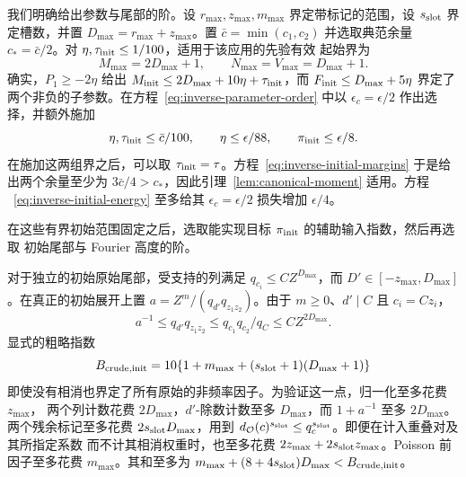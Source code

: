 我们明确给出参数与尾部的阶。设 \(r_{\max},z_{\max},m_{\max}\) 界定带标记的范围，设
\(s_{\rm slot}\) 界定槽数，并置 \(D_{\max}=r_{\max}+z_{\max}\)。置 \(\bar c=\min(c_1,c_2)\)
并选取典范余量 \(c_*=\bar c/2\)。对 \(\eta,\tau_{\rm init}\le1/100\)，适用于该应用的先验有效
起始界为
\[
 M_{\max}=2D_{\max}+1,\qquad N_{\max}=V_{\max}=D_{\max}+1.
\]
确实，\(P_1\ge-2\eta\) 给出 \(M_{\rm init}\le2D_{\max}+10\eta+\tau_{\rm init}\)，而
\(F_{\rm init}\le D_{\max}+5\eta\) 界定了两个非负的子参数。在方程~\eqref{eq:inverse-parameter-order}
中以 \(\epsilon_c=\epsilon/2\) 作出选择，并额外施加
\[
 \eta,\tau_{\rm init}\le\bar c/100,\qquad
 \eta\le\epsilon/88,\qquad \pi_{\rm init}\le\epsilon/8.
\]
在施加这两组界之后，可以取 \(\tau_{\rm init}=\tau\)。方程~\eqref{eq:inverse-initial-margins}
于是给出两个余量至少为 \(3\bar c/4>c_*\)，因此引理~\ref{lem:canonical-moment} 适用。方程
~\eqref{eq:inverse-initial-energy} 至多给其 \(\epsilon_c=\epsilon/2\) 损失增加 \(\epsilon/4\)。

在这些有界初始范围固定之后，选取能实现目标 \(\pi_{\rm init}\) 的辅助输入指数，然后再选取
初始尾部与 Fourier 高度的阶。

对于独立的初始原始尾部，受支持的列满足 \(q_{c_i}\le C Z^{D_{\max}}\)，而
\(D'\in[-z_{\max},D_{\max}]\)。在真正的初始展开上置 \(a=Z^m/(q_{d'}q_{z_1z_2})\)。由于
\(m\ge0\)、\(d'\mid C\) 且 \(c_i=Cz_i\)，
\[
 a^{-1}\le q_{d'}q_{z_1z_2}
       \le q_{c_1}q_{c_2}/q_C\le C Z^{2D_{\max}}.
\]
显式的粗略指数
\[
 B_{\rm crude,init}=10\{1+m_{\max}+(s_{\rm slot}+1)(D_{\max}+1)\}
\]
即使没有相消也界定了所有原始的非频率因子。为验证这一点，归一化至多花费 \(z_{\max}\)，
两个列计数花费 \(2D_{\max}\)，\(d'\)-除数计数至多 \(D_{\max}\)，而 \(1+a^{-1}\) 至多
\(2D_{\max}\)。两个残余标记至多花费 \(2s_{\rm slot}D_{\max}\)，用到
\(d_{\mathcal O}(c)^{s_{\rm slot}}\le q_c^{s_{\rm slot}}\)。即便在计入重叠对及其所指定系数
而不计其相消权重时，也至多花费 \(2z_{\max}+2s_{\rm slot}z_{\max}\)。Poisson 前因子至多花费
\(m_{\max}\)。其和至多为
\(m_{\max}+(8+4s_{\rm slot})D_{\max}<B_{\rm crude,init}\)。
